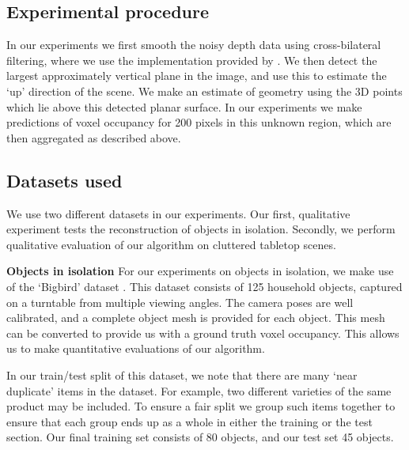 \documentclass[10pt,twocolumn,letterpaper]{article}
\renewcommand{\paragraph}{\vspace{2pt}\noindent\textbf}
\begin{document}
\subsection{Experimental procedure}

In our experiments we first smooth the noisy depth data using cross-bilateral filtering, where we use the implementation provided by \cite{silberman-eccv-2012}.
We then detect the largest approximately vertical plane in the image, and use this to estimate the `up' direction of the scene.
We make an estimate of geometry using the 3D points which lie above this detected planar surface.
In our experiments we make predictions of voxel occupancy for 200 pixels in this unknown region, which are then aggregated as described above.


\subsection{Datasets used}

We use two different datasets in our experiments.
Our first, qualitative experiment tests the reconstruction of objects in isolation.
Secondly, we perform qualitative evaluation of our algorithm on cluttered tabletop scenes.


\paragraph{Objects in isolation}
For our experiments on objects in isolation, we make use of the `Bigbird' dataset \cite{singh-icra-2014}. 
This dataset consists of 125 household objects, captured on a turntable from multiple viewing angles.
The camera poses are well calibrated, and a complete object mesh is provided for each object.
This mesh can be converted to provide us with a ground truth voxel occupancy.
This allows us to make quantitative evaluations of our algorithm.

In our train/test split of this dataset, we note that there are many `near duplicate' items in the dataset.
For example, two different varieties of the same product may be included.
To ensure a fair split we group such items together to ensure that each group ends up as a whole in either the training or the test section.
Our final training set consists of 80 objects, and our test set 45 objects.
\end{document}
